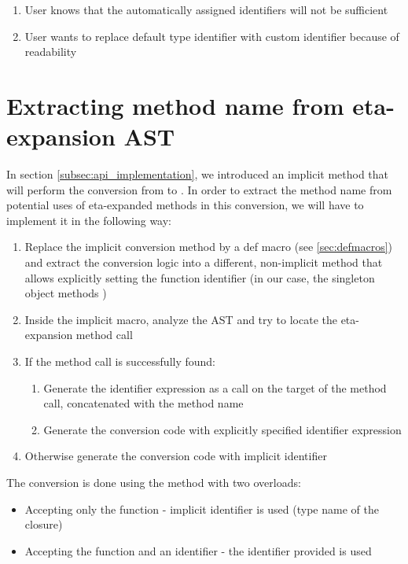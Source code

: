 \begin{enumerate}
	\item User knows that the automatically assigned identifiers will not be sufficient
	\item User wants to replace default type identifier with custom identifier because of readability
\end{enumerate}

\section{Extracting method name from eta-expansion AST}
\label{sec:extracting_method_name}


In section \ref{subsec:api_implementation}, we introduced an implicit method that will perform the conversion from  to . In order to extract the method name from potential uses of eta-expanded methods in this conversion, we will have to implement it in the following way:

\begin{enumerate}
	\item Replace the implicit conversion method by a def macro (see \ref{sec:defmacros}) and extract the conversion logic into a different, non-implicit method that allows explicitly setting the function identifier (in our case, the  singleton object methods )
	\item Inside the implicit macro, analyze the AST and try to locate the \mbox{eta-expansion} method call
	\item If the method call is successfully found:
	\begin{enumerate}
		\item Generate the identifier expression as a  call on the target of the method call, concatenated with the method name
		\item Generate the conversion code with explicitly specified identifier expression
	\end{enumerate}
	\item Otherwise generate the conversion code with implicit identifier	
\end{enumerate}

The conversion is done using the  method with two overloads:
\begin{itemize}
	\item Accepting only the function - implicit identifier is used (type name of the closure)
	\item Accepting the function and an identifier - the identifier provided is used
\end{itemize}

